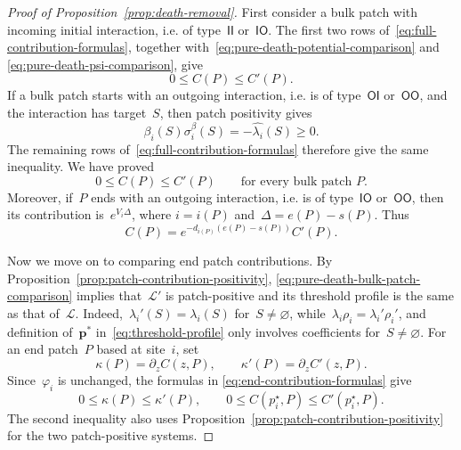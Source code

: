 \documentclass[EJP,preprint,NODS,nobera]{ejpecp}
\newcommand{\bb}[1]{\left(#1\right)}
\newcommand{\vn}{\varnothing}
\newcommand{\mb}[1]{\mathbf{#1}}
\newcommand{\Lcal}{\mathcal{L}}
\begin{document}
\begin{proof}[Proof of Proposition~\ref{prop:death-removal}]
First consider a bulk patch with incoming initial interaction, i.e. of type~$\mathsf{II}$ or~$\mathsf{IO}$. The first two
rows of~\eqref{eq:full-contribution-formulas},
together with~\eqref{eq:pure-death-potential-comparison} and
\eqref{eq:pure-death-psi-comparison}, give
\begin{equation*}
0\leq C(P)\leq C'(P).
\end{equation*}
If a bulk patch starts with an outgoing interaction, i.e. is of type~$\mathsf{OI}$ or~$\mathsf{OO}$, and the interaction has target~$S$, then patch positivity gives
\begin{equation*}
\beta_i(S)\sigma_i^\beta(S)
=
-\widehat{\lambda_i}(S)
\geq0.
\end{equation*}
The remaining rows of~\eqref{eq:full-contribution-formulas} therefore give the
same inequality. We have proved
\begin{equation}
\label{eq:pure-death-bulk-patch-comparison}
0\leq C(P)\leq C'(P)
\qquad
\text{for every bulk patch }P.
\end{equation}
Moreover, if~$P$ ends with an outgoing interaction, i.e. is of type~$\mathsf{IO}$ or~$\mathsf{OO}$, then its contribution is~$e^{V_i\Delta}$, where
$i=i(P)$ and~$\Delta=e(P)-s(P)$. Thus
\begin{equation}
\label{eq:pure-death-outgoing-terminal-factor}
C(P)
=
e^{-d_{i(P)}\bb{e(P)-s(P)}}C'(P).
\end{equation}

Now we move on to comparing end patch contributions. By Proposition~\ref{prop:patch-contribution-positivity},
\eqref{eq:pure-death-bulk-patch-comparison} implies that~$\Lcal'$ is
patch-positive and its threshold profile is the same as that of~$\Lcal$. Indeed,~$\lambda_i'(S) = \lambda_i(S)$ for~$S\neq \vn$, while~$\lambda_i\rho_i=\lambda_i'\rho_i'$,
and definition of~$\mb p^*$ in~\eqref{eq:threshold-profile} only involves coefficients for~$S\neq \vn$. For an end patch~$P$ based at
site~$i$, set
\begin{equation*}
\kappa(P)=\partial_zC(z,P),
\qquad
\kappa'(P)=\partial_zC'(z,P).
\end{equation*}
Since~$\varphi_i$ is unchanged, the formulas in
\eqref{eq:end-contribution-formulas} give
\begin{equation}
\label{eq:pure-death-end-patch-comparison}
0\leq\kappa(P)\leq\kappa'(P),
\qquad
0\leq C\bb{p_i^\star,P}
\leq
C'\bb{p_i^\star,P}.
\end{equation}
The second inequality also uses Proposition~\ref{prop:patch-contribution-positivity}
for the two patch-positive systems.


\end{proof}
\end{document}
